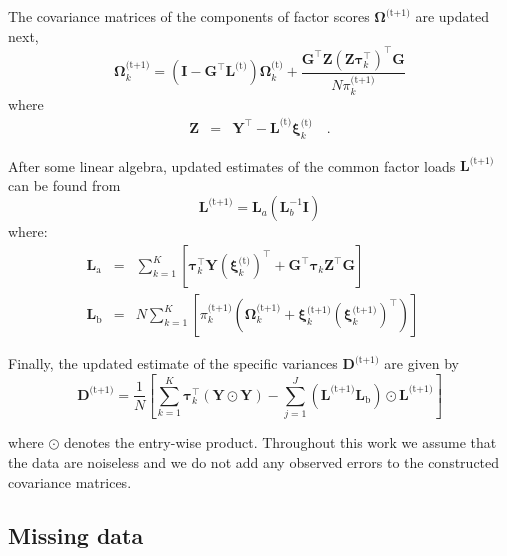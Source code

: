 \documentclass[twocolumn]{aastex62}
\newcommand{\vect}[1]{\boldsymbol{\mathbf{#1}}}
\renewcommand{\vec}[1]{\vect{#1}}
\newcommand{\weight}{\pi}
\newcommand{\data}{\textbf{Y}}
\newcommand{\vecdata}{\vec\data}
\newcommand{\nextstep}{^\textrm{(t+1)}}
\newcommand{\thisstep}{^\textrm{(t)}}
\newcommand{\transpose}{^\intercal}
\newcommand{\eye}{\textbf{I}}
\newcommand{\factorloads}{\textbf{L}}
\newcommand{\specificvariance}{\vec{D}}
\newcommand{\scoremeans}{\vec\xi}
\newcommand{\scorecovs}{\vec\Omega}
\newcommand{\NumData}{N}
\newcommand{\NumComponents}{K}
\newcommand{\numcomponents}{k}
\begin{document}
The covariance matrices of the components of factor scores $\scorecovs\nextstep$
are updated next,
\begin{equation}
	\scorecovs_\numcomponents\nextstep = \left(\eye - \vec{G}\transpose\factorloads\thisstep\right)\scorecovs_\numcomponents\thisstep + \frac{\vec{G}\transpose\vec{Z}\left(\vec{Z}\vec\tau_\numcomponents\transpose\right)\transpose\vec{G}}{N\weight_\numcomponents\nextstep}
\end{equation}
\noindent{}where
\begin{eqnarray}
	\vec{Z} &=& \vecdata\transpose - \factorloads\thisstep\scoremeans_\numcomponents\thisstep \quad .
\end{eqnarray}

After some linear algebra, updated estimates of the common factor loads $\factorloads\nextstep$
can be found from
\begin{equation}
	\factorloads\nextstep = \factorloads_{a}\left(\factorloads_{b}^{-1}\eye\right)
\end{equation}
\noindent{}where:
\begin{eqnarray}
	\factorloads_\textrm{a} &=& \sum_{\numcomponents=1}^{\NumComponents}\left[ \vec\tau_\numcomponents\transpose\vecdata\left(\scoremeans_\numcomponents\thisstep\right)\transpose + 
	\vec{G}\transpose\vec\tau_\numcomponents\vec{Z}\transpose\vec{G}\right] \\
	\factorloads_\textrm{b} &=& N\sum_{\numcomponents=1}^{\NumComponents}\left[\weight_\numcomponents\nextstep\left(\scorecovs_\numcomponents\nextstep + \scoremeans_\numcomponents\nextstep\left(\scoremeans_\numcomponents\nextstep\right)\transpose\right)\right] \quad
\end{eqnarray}


Finally, the updated estimate of the specific variances $\specificvariance\nextstep$ are given
by
\begin{equation}
	\specificvariance\nextstep = \frac{1}{\NumData}\left[\sum^{\NumComponents}_{\numcomponents=1}\vec\tau_\numcomponents\transpose\left(\vecdata\odot\vecdata\right) - \sum_{j=1}^{J}\left(\factorloads\nextstep\factorloads_\textrm{b}\right)\odot\factorloads\nextstep\right]
\end{equation}

\noindent{}where $\odot$ denotes the entry-wise product. 
Throughout this work we assume that the data are noiseless and
we do not add any observed errors to the constructed covariance matrices.


\subsection{Missing data}
\end{document}
